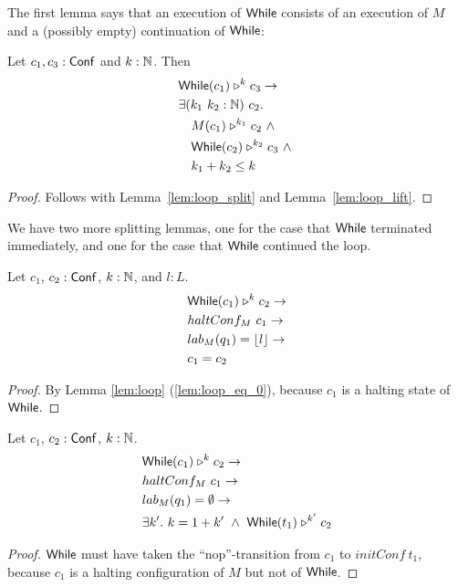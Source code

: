 The first lemma says that an execution of $\mathsf{While}$ consists of an execution of $M$ and a (possibly empty) continuation of $\mathsf{While}$:
\begin{lemma}
  \label{lem:While_split}
  Let $c_1, c_3 : \mathsf{Conf}$ and $k:\mathbb{N}$.  Then
  \begin{alignat*}{1}
    & \mathsf{While}(c_1) \mathrel{\triangleright}^k c_3 \rightarrow \\
    & \exists (k_1~k_2 : \mathbb{N})~c_2. \\
    & \quad M(c_1) \mathrel{\triangleright}^{k_1} c_2 ~\land~ \\
    & \quad \mathsf{While}(c_2) \mathrel{\triangleright}^{k_2} c_3 ~\land~\\
    & \quad k_1 + k_2 \leq k
  \end{alignat*}
\end{lemma}
\begin{proof}
  Follows with Lemma~\ref{lem:loop_split} and Lemma~\ref{lem:loop_lift}.
\end{proof}

We have two more splitting lemmas, one for the case that $\mathsf{While}$ terminated immediately, and one for the case that $\mathsf{While}$ continued the loop.
\begin{lemma}
  \label{lem:While_split_term}
  Let $c_1$, $c_2 : \mathsf{Conf}$, $k:\mathbb{N}$, and $l:L$.
  \begin{alignat*}{1}
    & \mathsf{While}(c_1) \mathrel{\triangleright}^k c_2 \rightarrow \\
    & haltConf_M~c_1 \rightarrow \\
    & lab_M(q_1) = \left\lfloor {l} \right\rfloor \rightarrow \\
    & c_1 = c_2
  \end{alignat*}
\end{lemma}
\begin{proof}
  By Lemma \ref{lem:loop} (\ref{lem:loop_eq_0}), because $c_1$ is a halting state of $\mathsf{While}$.
\end{proof}
\begin{lemma}
  \label{lem:While_split_repeat}
  Let $c_1$, $c_2 : \mathsf{Conf}$, $k:\mathbb{N}$.
  \begin{alignat*}{1}
    & \mathsf{While}(c_1) \mathrel{\triangleright}^k c_2 \rightarrow \\
    & haltConf_M~c_1 \rightarrow \\
    & lab_M(q_1) = \emptyset \rightarrow \\
    & \exists k'.~k = 1+k' ~\land~ \mathsf{While}(t_1) \mathrel{\triangleright}^{k'} c_2
  \end{alignat*}
\end{lemma}
\begin{proof}
  $\mathsf{While}$ must have taken the ``nop''-transition from $c_1$ to $initConf~t_1$, because $c_1$ is a halting configuration of $M$ but not of $\mathsf{While}$.
\end{proof}


